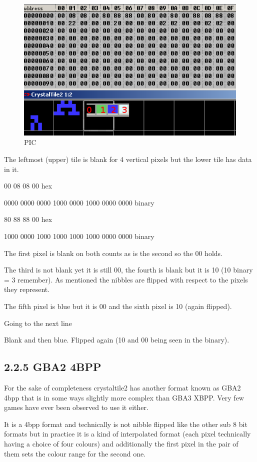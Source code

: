 \documentclass[
]{book}
\begin{document}
\begin{figure}
\centering
\includegraphics{images/24_home_fast6191_romhackingguide_unrenamed_file___original_borders_romhackingguide2dGBA3XBPP2.png}
\caption{PIC}
\end{figure}

The leftmost (upper) tile is blank for 4 vertical pixels but the lower tile has data in it.

00 08 08 00 hex

0000 0000 0000 1000 0000 1000 0000 0000 binary

80 88 88 00 hex

1000 0000 1000 1000 1000 1000 0000 0000 binary

The first pixel is blank on both counts as is the second so the 00 holds.

The third is not blank yet it is still 00, the fourth is blank but it is 10 (10 binary = 3 remember). As mentioned the nibbles are flipped with respect to the pixels they represent.

The fifth pixel is blue but it is 00 and the sixth pixel is 10 (again flipped).

Going to the next line

Blank and then blue. Flipped again (10 and 00 being seen in the binary).

\hypertarget{gba2-4bpp}{%
\subsection{2.2.5 GBA2 4BPP}\label{gba2-4bpp}}

For the sake of completeness crystaltile2 has another format known as GBA2 4bpp that is in some ways slightly more complex than GBA3 XBPP. Very few games have ever been observed to use it either.

It is a 4bpp format and technically is not nibble flipped like the other sub 8 bit formats but in practice it is a kind of interpolated format (each pixel technically having a choice of four colours) and additionally the first pixel in the pair of them sets the colour range for the second one.
\end{document}
